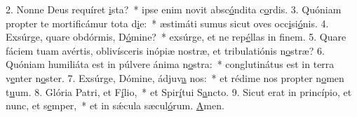 2. Nonne Deus requíret \uline{i}sta?~* ipse enim novit absc\uline{ó}ndita c\uline{o}rdis.
3. Quóniam propter te mortificámur tota d\uline{i}e:~* æstimáti sumus sicut oves occ\uline{i}si\uline{ó}nis.
4. Exsúrge, quare obdórmis, D\uline{ó}mine?~* exsúrge, et ne rep\uline{é}llas in f\uline{i}nem.
5. Quare fáciem tuam avértis, oblivísceris inópiæ nostræ, et tribulatiónis n\uline{o}stræ?
6. Quóniam humiliáta est in púlvere ánima n\uline{o}stra:~* conglutinátus est in terra v\uline{e}nter n\uline{o}ster.
7. Exsúrge, Dómine, ádjuv\uline{a} nos:~* et rédime nos propter n\uline{o}men t\uline{u}um.
8. Glória Patri, et F\uline{í}lio,~* et Spir\uline{í}tui S\uline{a}ncto.
9. Sicut erat in princípio, et nunc, et s\uline{e}mper,~* et in sǽcula sæcul\uline{ó}rum. \uline{A}men.

